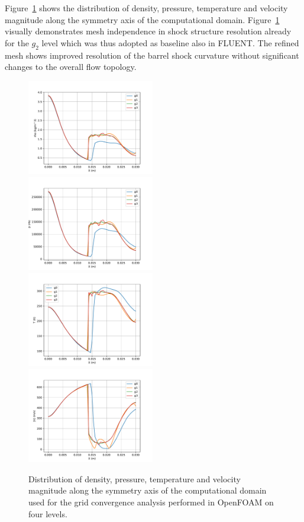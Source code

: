 \documentclass[12pt]{article}
\begin{document}
Figure~\ref{fig:conv} shows the distribution of density, pressure, temperature and velocity magnitude along the symmetry axis of the computational domain. Figure~\ref{fig:conv} visually demonstrates mesh independence in shock structure resolution already for the $g_2$ level which was thus adopted as baseline also in FLUENT. The refined mesh shows improved resolution of the barrel shock curvature without significant changes to the overall flow topology.
%
\begin{figure}[H]
    \centering
   \includegraphics[width=0.495\textwidth]{figs/rho.pdf}
   \includegraphics[width=0.495\textwidth]{figs/pres.pdf}\\
   \includegraphics[width=0.495\textwidth]{figs/temp.pdf}
   \includegraphics[width=0.495\textwidth]{figs/vel.pdf}
    \caption{Distribution of density, pressure, temperature and velocity magnitude along the symmetry axis of the computational domain used for the grid convergence analysis performed in OpenFOAM on four levels.}
    \label{fig:conv}
\end{figure}
\end{document}
